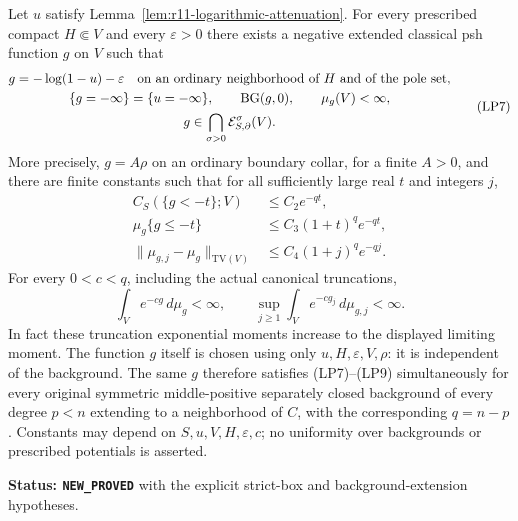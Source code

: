 \begin{theorem}
\label{thm:r11-all-power-pole-representative}
Let $u$ satisfy Lemma~\ref{lem:r11-logarithmic-attenuation}.
For every prescribed compact $H\Subset V$ and every
$\varepsilon>0$ there exists a negative extended classical
psh function $g$ on $V$ such that
\[
 \begin{gathered}
  g=-\log(1-u)-\varepsilon
       \quad\hbox{on an ordinary neighborhood of }H
                      \hbox{ and of the pole set},\\
  \{g=-\infty\}=\{u=-\infty\},\qquad
  \mathrm{BG}(g,0),\qquad \mu_g(V)<\infty,\\
  g\in\bigcap_{\sigma>0}\mathcal E^\sigma_{S,\partial}(V).
 \end{gathered}
 \tag{LP7}
\]
More precisely, $g=A\rho$ on an ordinary boundary collar,
for a finite $A>0$, and there are finite constants such that
for all sufficiently large real $t$ and integers $j$,
\[
 \begin{split}
 C_S(\{g<-t\};V)&\leq C_2e^{-qt},\\
 \mu_g\{g\leq-t\}&\leq C_3(1+t)^q e^{-qt},\\
 \|\mu_{g,j}-\mu_g\|_{\mathrm{TV}(V)}
                  &\leq C_4(1+j)^q e^{-qj}.
 \end{split}
 \tag{LP8}
\]
For every $0<c<q$, including the actual canonical truncations,
\[
       \int_V e^{-cg}\,d\mu_g<\infty,
       \qquad
       \sup_{j\geq1}\int_Ve^{-cg_j}\,d\mu_{g,j}<\infty.
 \tag{LP9}
\]
In fact these truncation exponential moments increase to the
displayed limiting moment. The function $g$ itself is chosen
using only $u,H,\varepsilon,V,\rho$: it is independent of the
background. The same $g$ therefore satisfies (LP7)--(LP9)
simultaneously for every original symmetric middle-positive
separately closed background of every degree $p<n$ extending
to a neighborhood of $C$, with the corresponding $q=n-p$.
Constants may depend on $S,u,V,H,\varepsilon,c$; no uniformity
over backgrounds or prescribed potentials is asserted.
\end{theorem}

\noindent\textbf{Status: \texttt{NEW\_PROVED}} with the
explicit strict-box and background-extension hypotheses.

